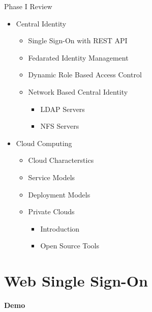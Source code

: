 \documentclass[10pt,xcolor=dvipsnames]{beamer}
\begin{document}
\begin{frame}[allowframebreaks]{Phase I Review }
\begin{itemize}
		\item Central Identity
		\begin{itemize}
			\item Single Sign-On with REST API
			\item Fedarated Identity Management
			\item Dynamic Role Based Access Control
			\item Network Based Central Identity
			\begin{itemize}
				\item LDAP Servers
				\item NFS Servers
			\end{itemize}
		\end{itemize}
		
		\framebreak
		\item Cloud Computing
		\begin{itemize}
			\item Cloud Characterstics
			\item Service Models 
			\item Deployment Models 
			\item Private Clouds 
			\begin{itemize}
			 	\item Introduction 
				\item Open Source Tools 
			\end{itemize}	
		\end{itemize}		 
				

	\end{itemize}
\end{frame}
\section{Web Single Sign-On}

\begin{frame}
\begin{center}
\textbf{Demo}
\end{center}
\end{frame}
\end{document}
